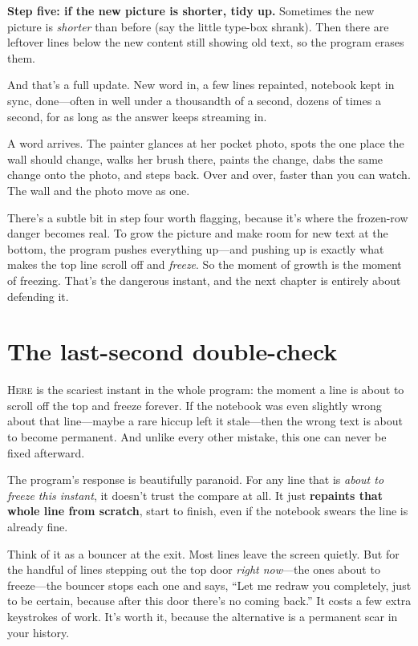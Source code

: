 \documentclass[11pt,twoside]{book}
\begin{document}
\textbf{Step five: if the new picture is shorter, tidy up.} Sometimes the new
picture is \emph{shorter} than before (say the little type-box shrank). Then
there are leftover lines below the new content still showing old text, so the
program erases them.

And that's a full update. New word in, a few lines repainted, notebook kept
in sync, done---often in well under a thousandth of a second, dozens of times
a second, for as long as the answer keeps streaming in.

\begin{pic}
A word arrives. The painter glances at her pocket photo, spots the one place
the wall should change, walks her brush there, paints the change, dabs the
same change onto the photo, and steps back. Over and over, faster than you
can watch. The wall and the photo move as one.
\end{pic}

There's a subtle bit in step four worth flagging, because it's where the
frozen-row danger becomes real. To grow the picture and make room for new
text at the bottom, the program pushes everything up---and pushing up is
exactly what makes the top line scroll off and \emph{freeze}. So the moment
of growth is the moment of freezing. That's the dangerous instant, and the
next chapter is entirely about defending it.

\chapter{The last-second double-check}
\lettrine{H}{ere} is the scariest instant in the whole program: the moment a
line is about to scroll off the top and freeze forever. If the notebook was
even slightly wrong about that line---maybe a rare hiccup left it stale---then
the wrong text is about to become permanent. And unlike every other mistake,
this one can never be fixed afterward.

The program's response is beautifully paranoid. For any line that is
\emph{about to freeze this instant}, it doesn't trust the compare at all. It
just \textbf{repaints that whole line from scratch}, start to finish, even if
the notebook swears the line is already fine.

Think of it as a bouncer at the exit. Most lines leave the screen quietly.
But for the handful of lines stepping out the top door \emph{right now}---the
ones about to freeze---the bouncer stops each one and says, ``Let me redraw
you completely, just to be certain, because after this door there's no coming
back.'' It costs a few extra keystrokes of work. It's worth it, because the
alternative is a permanent scar in your history.
\end{document}
